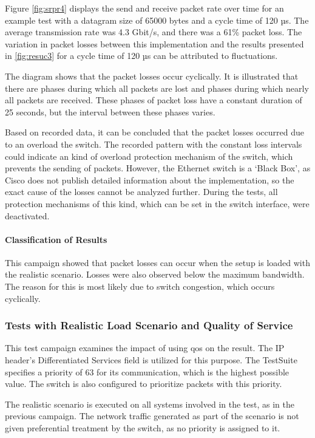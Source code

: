 Figure \ref{fig:srpr4} displays the send and receive packet rate over time for an example test with a datagram size of 65000 bytes and a cycle time of 120 µs. The average transmission rate was 4.3 Gbit/s, and there was a 61\% packet loss. The variation in packet losses between this implementation and the results presented in \ref{fig:resuc3} for a cycle time of 120 µs can be attributed to fluctuations.

The diagram shows that the packet losses occur cyclically. It is illustrated that there are phases during which all packets are lost and phases during which nearly all packets are received. These phases of packet loss have a constant duration of 25 seconds, but the interval between these phases varies.

Based on recorded data, it can be concluded that the packet losses occurred due to an overload the switch. The recorded pattern with the constant loss intervals could indicate an kind of overload protection mechanism of the switch, which prevents the sending of packets. However, the Ethernet switch is a `Black Box', as Cisco does not publish detailed information about the implementation, so the exact cause of the losses cannot be analyzed further. During the tests, all protection mechanisms of this kind, which can be set in the switch interface, were deactivated.

\paragraph{Classification of Results}
This campaign showed that packet losses can occur when the setup is loaded with the realistic scenario. Losses were also observed below the maximum bandwidth. The reason for this is most likely due to switch congestion, which occurs cyclically.

\subsubsection{Tests with Realistic Load Scenario and Quality of Service}
This test campaign examines the impact of using \ac{qos} on the result. The IP header's Differentiated Services field is utilized for this purpose. The TestSuite specifies a priority of 63 for its communication, which is the highest possible value. The switch is also configured to prioritize packets with this priority.

The realistic scenario is executed on all systems involved in the test, as in the previous campaign. The network traffic generated as part of the scenario is not given preferential treatment by the switch, as no priority is assigned to it.

